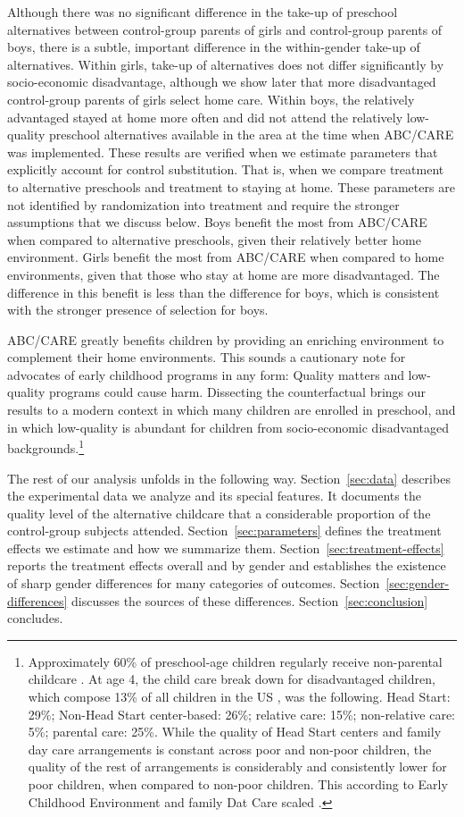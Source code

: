 Although there was no significant difference in the take-up of preschool alternatives between control-group parents of girls and control-group parents of boys, there is a subtle, important difference in the within-gender take-up of alternatives. Within girls, take-up of alternatives does not differ significantly by socio-economic disadvantage, although we show later that more disadvantaged control-group parents of girls select home care. Within boys, the relatively advantaged stayed at home more often and did not attend the relatively low-quality preschool alternatives available in the area at the time when ABC/CARE was implemented. These results are verified when we estimate parameters that explicitly account for control substitution. That is, when we compare treatment to alternative preschools and treatment to staying at home. These parameters are not identified by randomization into treatment and require the stronger assumptions that we discuss below. Boys benefit the most from ABC/CARE when compared to alternative preschools, given their relatively better home environment. Girls benefit the most from ABC/CARE when compared to home environments, given that those who stay at home are more disadvantaged. The difference in this benefit is less than the difference for boys, which is consistent with the stronger presence of selection for boys.

ABC/CARE greatly benefits children by providing an enriching environment to complement their home environments. This sounds a cautionary note for advocates of early childhood programs in any form: Quality matters and low-quality programs could cause harm. Dissecting the counterfactual brings our results to a modern context in which many children are enrolled in preschool, and in which low-quality is abundant for children from socio-economic disadvantaged backgrounds.\footnote{Approximately 60\% of preschool-age children regularly receive non-parental childcare \citep{FIFCFS_2009_Wellbeing_REPORT}. At age 4, the child care break down for disadvantaged children, which compose 13\% of all children in the US \citep{USCB_2014_CoverageReport}, was the following. Head Start: 29\%; Non-Head Start center-based: 26\%; relative care: 15\%; non-relative care: 5\%; parental care: 25\%. While the quality of Head Start centers and family day care arrangements is constant across poor and non-poor children, the quality of the rest of arrangements is considerably and consistently lower for poor children, when compared to non-poor children. This according to Early Childhood Environment and family Dat Care scaled \citep{FIFCFS_2009_Wellbeing_REPORT}.}

The rest of our analysis unfolds in the following way. Section~\ref{sec:data} describes the experimental data we analyze and its special features. It documents the quality level of the alternative childcare that a considerable proportion of the control-group subjects attended. Section~\ref{sec:parameters} defines the treatment effects we estimate and how we summarize them. Section~\ref{sec:treatment-effects} reports the treatment effects overall and by gender and establishes the existence of sharp gender differences for many categories of outcomes. Section~\ref{sec:gender-differences} discusses the sources of these differences. Section~\ref{sec:conclusion} concludes.
